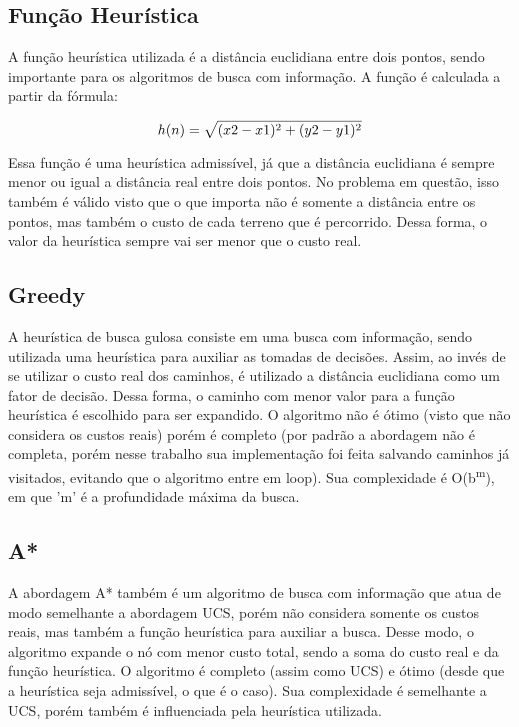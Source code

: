 \documentclass[10pt]{extarticle} %
\begin{document}
\subsection{Função Heurística}

A função heurística utilizada é a distância euclidiana entre dois pontos, sendo importante para os algoritmos de busca com informação. A função é calculada a partir da fórmula: 

\begin{equation}
    h(n) = \sqrt{(x2 - x1)\textsuperscript{2} + (y2 - y1)\textsuperscript{2}}
\end{equation}

Essa função é uma heurística admissível, já que a distância euclidiana é sempre menor ou igual a distância real entre dois pontos. No problema em questão, isso também é válido visto que o que importa não é somente a distância entre os pontos, mas também o custo de cada terreno que é percorrido. Dessa forma, o valor da heurística sempre vai ser menor que o custo real.

\subsection{Greedy}

A heurística de busca gulosa consiste em uma busca com informação, sendo utilizada uma heurística para auxiliar as tomadas de decisões. Assim, ao invés de se utilizar o custo real dos caminhos, é utilizado a distância euclidiana como um fator de decisão. Dessa forma, o caminho com menor valor para a função heurística é escolhido para ser expandido. O algoritmo não é ótimo (visto que não considera os custos reais) porém é completo (por padrão a abordagem não é completa, porém nesse trabalho sua implementação foi feita salvando caminhos já visitados, evitando que o algoritmo entre em loop). Sua complexidade é O(b\textsuperscript{m}), em que 'm' é a profundidade máxima da busca.

\subsection{A*}

A abordagem A* também é um algoritmo de busca com informação que atua de modo semelhante a abordagem UCS, porém não considera somente os custos reais, mas também a função heurística para auxiliar a busca. Desse modo, o algoritmo expande o nó com menor custo total, sendo a soma do custo real e da função heurística. O algoritmo é completo (assim como UCS) e ótimo (desde que a heurística seja admissível, o que é o caso). Sua complexidade é semelhante a UCS, porém também é influenciada pela heurística utilizada.
\end{document}
